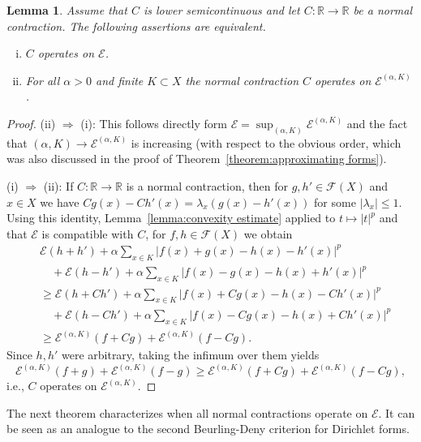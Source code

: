 \documentclass[a4paper,11pt,reqno]{amsart}
\newtheorem{lemma}{Lemma}[section]
\theoremstyle{definition}
\numberwithin{equation}{section}
\newcommand{\cE}{{\mathcal E}}
\newcommand{\cF}{{\mathcal F}}
\newcommand{\R}{{\mathbb R}}
\newcommand{\1}{\mathds{1}}
\begin{document}
\begin{lemma}\label{lemma:reduction to continuous case}
 Assume that $C$ is lower semicontinuous and let $C \colon \R \to \R$ be a normal contraction. The following assertions are equivalent. 
 \begin{enumerate}[(i)]
  \item $C$ operates on $\cE$. 
  \item For all $\alpha > 0$ and finite $K \subset X$ the normal contraction $C$ operates on $\cE^{(\alpha,K)}$. 
 \end{enumerate}
\end{lemma}
\begin{proof}
(ii) $\Rightarrow$ (i): This follows directly form $\cE = \sup_{(\alpha,K)}  \cE^{(\alpha,K)}$ and the fact that $(\alpha,K) \to \cE^{(\alpha,K)}$ is increasing (with respect to the obvious order, which was also discussed in the proof of Theorem~\ref{theorem:approximating forms}).
 
 
 (i) $\Rightarrow$ (ii): If $C \colon \R \to \R$ is a normal contraction, then for $g,h' \in \cF(X)$ and $x \in X$ we have $Cg(x) - Ch'(x) = \lambda_x (g(x) - h'(x))$ for some $|\lambda_x| \leq 1$.   Using this identity, Lemma~\ref{lemma:convexity estimate} applied to $t \mapsto |t|^p$ and that $\cE$ is compatible with $C$, for $f,h \in \cF(X)$ we obtain 
 \begin{align*}
 &\cE(h + h') + \alpha \sum_{x \in K} |f(x) + g(x)  - h(x) - h'(x)|^p\\
 &\quad + \cE(h - h') + \alpha \sum_{x \in K} |f(x) - g(x)  - h(x) + h'(x)|^p\\
  &\geq \cE(h + Ch') + \alpha \sum_{x \in K} |f(x) + Cg(x)  - h(x) - Ch'(x)|^p\\
  &\quad + \cE(h - Ch') + \alpha \sum_{x \in K} |f(x) - Cg(x)  - h(x) + Ch'(x)|^p\\
  &\geq \cE^{(\alpha,K)}(f + Cg) + \cE^{(\alpha,K)}(f- Cg).
 \end{align*}
 Since $h,h'$ were arbitrary, taking the infimum over them yields
 $$\cE^{(\alpha,K)}(f + g) + \cE^{(\alpha,K)}(f- g) \geq \cE^{(\alpha,K)}(f + Cg) + \cE^{(\alpha,K)}(f- Cg),$$
 i.e., $C$ operates on $\cE^{(\alpha,K)}$.
\end{proof}

  
  
  
The next theorem characterizes when all normal contractions operate on $\cE$. It can be seen as an analogue to the second Beurling-Deny criterion for Dirichlet forms. 
  
\end{document}
